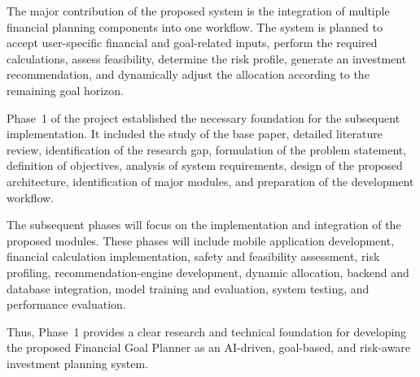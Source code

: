The major contribution of the proposed system is the integration of multiple financial planning components into one workflow. The system is planned to accept user-specific financial and goal-related inputs, perform the required calculations, assess feasibility, determine the risk profile, generate an investment recommendation, and dynamically adjust the allocation according to the remaining goal horizon.

Phase~1 of the project established the necessary foundation for the subsequent implementation. It included the study of the base paper, detailed literature review, identification of the research gap, formulation of the problem statement, definition of objectives, analysis of system requirements, design of the proposed architecture, identification of major modules, and preparation of the development workflow.

The subsequent phases will focus on the implementation and integration of the proposed modules. These phases will include mobile application development, financial calculation implementation, safety and feasibility assessment, risk profiling, recommendation-engine development, dynamic allocation, backend and database integration, model training and evaluation, system testing, and performance evaluation.

Thus, Phase~1 provides a clear research and technical foundation for developing the proposed Financial Goal Planner as an AI-driven, goal-based, and risk-aware investment planning system.
